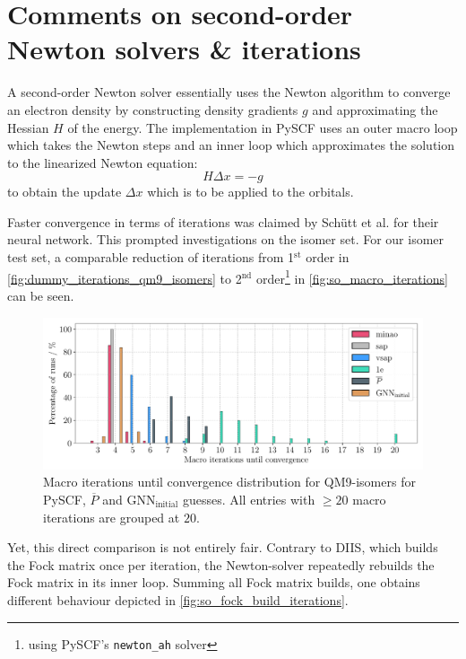 \section{Comments on second-order Newton solvers \& iterations}
\label{sec:notes_on_so_newton}
A second-order Newton solver essentially uses the Newton algorithm to converge an electron density by constructing density gradients $g$ and approximating the Hessian $H$ of the energy. The implementation in PySCF uses an outer macro loop which takes the Newton steps and an inner loop which approximates the solution to the linearized Newton equation:
\[H \Delta x = -g\]
to obtain the update $\Delta x$ which is to be applied to the orbitals.

Faster convergence in terms of iterations was claimed by Schütt et al. for their neural network. \parencite{ref:schuett_unifying_2019} This prompted investigations on the  isomer set. For our isomer test set, a comparable reduction of iterations from 1$^\text{st}$ order in \autoref{fig:dummy_iterations_qm9_isomers} to 2$^\text{nd}$ order\footnote{using PySCF's \texttt{newton\_ah} solver} in \autoref{fig:so_macro_iterations} can be seen. 
\begin{figure}[H]
    \centering
    \includegraphics[width=\textwidth]{../fig/gnn/SO_0D_GNN_model_iteration_count_bar.pdf}
    \caption[Macro iterations until convergence distribution for QM9-isomers]{Macro iterations until convergence distribution for QM9-isomers for PySCF, $\overline{P}$ and GNN$_\text{initial}$ guesses. All entries with $\geq 20$ macro iterations are grouped at $20$.}
    \label{fig:so_macro_iterations}
\end{figure}
Yet, this direct comparison is not entirely fair. Contrary to DIIS, which builds the Fock matrix once per iteration, the Newton-solver repeatedly rebuilds the Fock matrix in its inner loop. Summing all Fock matrix builds, one obtains different behaviour depicted in \autoref{fig:so_fock_build_iterations}.  
